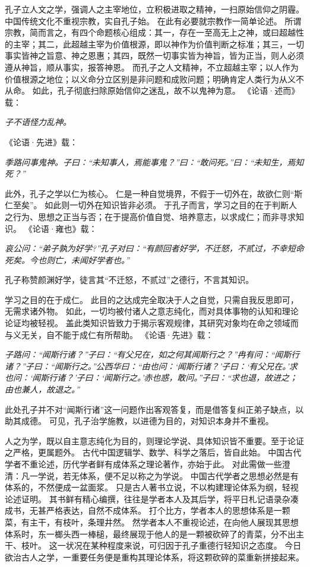 \documentclass[11pt]{article}
\begin{document}
\par

孔子立人文之学，强调人之主宰地位，立积极进取之精神，一扫原始信仰之阴霾。
中国传统文化不重视宗教，实自孔子始。
在此有必要就宗教作一简单论述。
所谓宗教，简而言之，有四个命题核心组成：其一，存在一至高无上之神，或曰超越性的主宰；其二，此超越主宰为价值根源，即以神作为价值判断之标准；其三，一切事实皆神之旨意、神之恩惠；其四，既然一切事实皆为神旨，皆为正当，则人必须遵从神旨，顺从事实，报答神恩。
而孔子之人文精神，不立超越主宰；以人作为价值根源之地位；以义命分立区别是非问题和成败问题；明确肯定人类行为从义不从命。
如此，孔子彻底扫除原始信仰之迷乱，故不以鬼神为意。
《论语·述而》载：

\textit{子不语怪力乱神。}

《论语·先进》载：

\textit{季路问事鬼神。子曰：“未知事人，焉能事鬼？”曰：“敢问死。”曰：“未知生，焉知死？”}

\par

此外，孔子之学以仁为核心。
仁是一种自觉境界，不假于一切外在，故欲仁则“斯仁至矣”。
如此则一切外在知识皆非必须。
于孔子而言，学习之目的在于判断人之行为、思想之正当与否；在于提高价值自觉、培养意志，以求成仁；而非寻求知识。
《论语·雍也》载：

\textit{哀公问：“弟子孰为好学?”孔子对曰：“有颜回者好学，不迁怒，不贰过，不幸短命死矣。今也则亡，未闻好学者也。”}

孔子称赞颜渊好学，徒言其“不迁怒，不贰过”之德行，不言其知识。

\par

学习之目的在于成仁。
此目的之达成完全取决于人之自觉，只需自我反思即可，无需求诸外物。
如此，一切均被付诸人之意志纯化，而对具体事物的认知和理论论证均被轻视。
盖此类知识皆致力于揭示客观规律，其研究对象均在命之领域而与义无关，自不能于成仁有所帮助。
《论语·先进》载：

\textit{子路问：“闻斯行诸？”子曰：“有父兄在，如之何其闻斯行之？”冉有问：“闻斯行诸？”子曰：“闻斯行之。”公西华曰：“由也问：‘闻斯行诸？’子曰：‘有父兄在。’求也问：‘闻斯行诸？’子曰：‘闻斯行之。’赤也惑，敢问。”子曰：“求也退，故进之；由也兼人，故退之。”}

此处孔子并不对“闻斯行诸”这一问题作出客观答复，而是借答复纠正弟子缺点，以助其成德。
可见，孔子治学施教，以进德为目的，对知识本身并不重视。

\par

人之为学，既以自主意志纯化为目的，则理论学说、具体知识皆不重要。至于论证之严格，更属题外。
古代中国逻辑学、数学、科学之落后，皆自此始。
中国古代学者不重论述，历代学者鲜有成体系之理论著作，亦始于此。
对此需做一些澄清：凡一学说，若无体系，便不足以称之为学说。
中国古代学者之思想必然是有体系的，不然便成一盆面浆。
只是古人著书立说，不以构建理论体系为纲，轻视论述证明。
其书鲜有精心编撰，往往是学者本人及其后学，将平日札记语录杂凑成书，无甚严格表达，自然不成体系。
打个比方，学者本人的思想体系是一颗菜，有主干，有枝叶，条理井然。
然学者本人不重视论述，在向他人展现其思想体系时，东一榔头西一棒槌，最终展现于他人的是一颗被砍碎了的青菜，分不出主干、枝叶。
这一状况在某种程度来说，可归因于孔子重德行轻知识之态度。
今日欲治古人之学，一重要任务便是重构其理论体系，将这颗砍碎的菜重新拼接起来。
  
\end{document}
